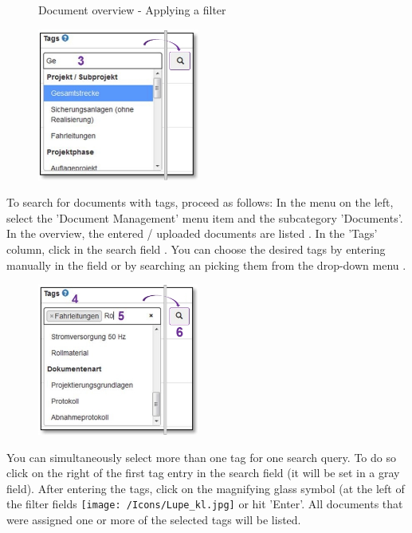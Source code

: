 \begin{figure}[H]
\caption{Document overview - Applying a filter}
\end{figure}

\pagebreak

\begin{figure}
\vspace{-10pt}
\includegraphics[height=50mm]{../chapters/11_Dokumentenablage/pictures/11-2-8_DokTagHinzufuegen.jpg}
\end{figure}
To search for documents with tags, proceed as follows:
In the menu on the left, select the 'Document Management' menu item and the subcategory 'Documents'. In the overview, the entered / uploaded documents are listed . In the 'Tags' column, click in the search field . You can choose the desired tags by entering manually in the field or by searching an picking them from the drop-down menu .

\vspace{\baselineskip}

\begin{figure}
\vspace{-30pt}
\includegraphics[height=50mm]{../chapters/11_Dokumentenablage/pictures/11-2-8_TagEingabe.jpg}
\end{figure}
You can simultaneously select more than one tag for one search query. To do so click on the right of the first tag entry  in the search field  (it will be set in a gray field). After entering the tags, click on the magnifying glass symbol (at the left of the filter fields \texttt{[image: /Icons/Lupe\_kl.jpg]}  or hit 'Enter'. All documents that were assigned one or more of the selected tags will be listed.

